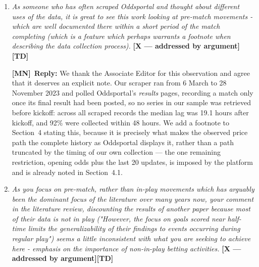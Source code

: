 \documentclass[letterpaper,12pt]{article}
\newcounter{b}
\newcommand{\argX}{\textcolor{green!55!black}{\textbf{[X --- addressed by argument]}}}
\newcommand{\argT}{\textcolor{blue!75!black}{\textbf{[TD]}}}
\newcommand{\ReplyMN}[1]{\par\noindent%
  \textcolor{mncol}{\textbf{[MN]}}~\textbf{Reply:} #1}
\begin{document}
\begin{enumerate}
\item \textit{As someone who has often scraped Oddsportal and thought about different uses of the data, it is great to see this work looking at pre-match movements - which are well documented there within a short period of the match completing (which is a feature which perhaps warrants a footnote when describing the data collection process). } \argX \argT

\ReplyMN{We thank the Associate Editor for this observation and agree that it deserves an explicit note. Our scraper ran from 6 March to 28 November 2023 and polled Oddsportal's \emph{results} pages, recording a match only once its final result had been posted, so no series in our sample was retrieved before kickoff: across all scraped records the median lag was 19.1 hours after kickoff, and 92\% were collected within 48 hours. We add a footnote to Section~4 stating this, because it is precisely what makes the observed price path the complete history as Oddsportal displays it, rather than a path truncated by the timing of our own collection --- the one remaining restriction, opening odds plus the last 20 updates, is imposed by the platform and is already noted in Section~4.1.}

\item \textit{As you focus on pre-match, rather than in-play movements which has arguably been the dominant focus of the literature over many years now, your comment in the literature review, discounting the results of another paper because most of their data is not in play ("However, the focus on goals scored near half-time limits the generalizability of their findings to events occurring during regular play") seems a little inconsistent with what you are seeking to achieve here - emphasis on the importance of non-in-play betting activities. } \argX \argT


\end{enumerate}
\end{document}
